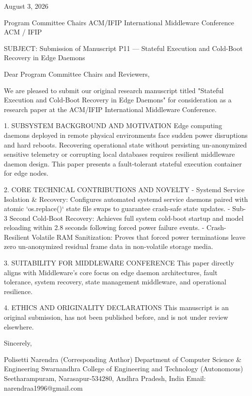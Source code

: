 August 3, 2026

Program Committee Chairs
ACM/IFIP International Middleware Conference
ACM / IFIP

SUBJECT: Submission of Manuscript P11 — Stateful Execution and Cold-Boot Recovery in Edge Daemons

Dear Program Committee Chairs and Reviewers,

We are pleased to submit our original research manuscript titled "Stateful Execution and Cold-Boot Recovery in Edge Daemons" for consideration as a research paper at the ACM/IFIP International Middleware Conference.

1. SUBSYSTEM BACKGROUND AND MOTIVATION
Edge computing daemons deployed in remote physical environments face sudden power disruptions and hard reboots. Recovering operational state without persisting un-anonymized sensitive telemetry or corrupting local databases requires resilient middleware daemon design. This paper presents a fault-tolerant stateful execution container for edge nodes.

2. CORE TECHNICAL CONTRIBUTIONS AND NOVELTY
  - Systemd Service Isolation & Recovery: Configures automated systemd service daemons paired with atomic `os.replace()` state file swaps to guarantee crash-safe state updates.
  - Sub-3 Second Cold-Boot Recovery: Achieves full system cold-boot startup and model reloading within 2.8 seconds following forced power failure events.
  - Crash-Resilient Volatile RAM Sanitization: Proves that forced power terminations leave zero un-anonymized residual frame data in non-volatile storage media.

3. SUITABILITY FOR MIDDLEWARE CONFERENCE
This paper directly aligns with Middleware's core focus on edge daemon architectures, fault tolerance, system recovery, state management middleware, and operational resilience.

4. ETHICS AND ORIGINALITY DECLARATIONS
This manuscript is an original submission, has not been published before, and is not under review elsewhere.

Sincerely,

Polisetti Narendra (Corresponding Author)
Department of Computer Science & Engineering
Swarnandhra College of Engineering and Technology (Autonomous)
Seetharampuram, Narasapur-534280, Andhra Pradesh, India
Email: narendraa1996@gmail.com
